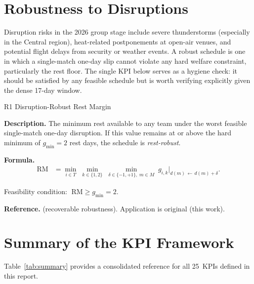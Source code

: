 \documentclass[12pt, letterpaper]{article}
\newcommand{\kpilabel}[1]{\noindent\textbf{#1}\enspace}
\begin{document}
\section{Robustness to Disruptions}

Disruption risks in the 2026 group stage include severe thunderstorms
(especially in the Central region), heat-related postponements at
open-air venues, and potential flight delays from security or weather
events.  A robust schedule is one in which a single-match one-day slip
cannot violate any hard welfare constraint, particularly the rest floor.
The single KPI below serves as a hygiene check: it should be satisfied
by any feasible schedule but is worth verifying explicitly given the
dense 17-day window.

\begin{kpibox}{R1 \textendash{} Disruption-Robust Rest Margin}

\kpilabel{Description.}
The minimum rest available to any team under the worst feasible
single-match one-day disruption.  If this value remains at or above the
hard minimum of $g_{\min}=2$ rest days, the schedule is
\emph{rest-robust}.

\medskip
\kpilabel{Formula.}
\begin{align*}
  \mathrm{RM} &= \min_{i \in T}\;\min_{k \in \{1,2\}}\;
    \min_{\delta \in \{-1,+1\},\;m \in M}\;
    g_{i,k}\!\big|_{d(m)\,\leftarrow\,d(m)+\delta}.
\end{align*}
\vspace{-8pt}

\noindent
Feasibility condition: $\;\mathrm{RM} \geq g_{\min} = 2$.

\medskip
\kpilabel{Reference.}
\citet{Liebchen2009} (recoverable robustness).
Application is original (this work).
\end{kpibox}

\section{Summary of the KPI Framework}
\label{sec:summary}

Table~\ref{tab:summary} provides a consolidated reference for all
25~KPIs defined in this report.
\end{document}
